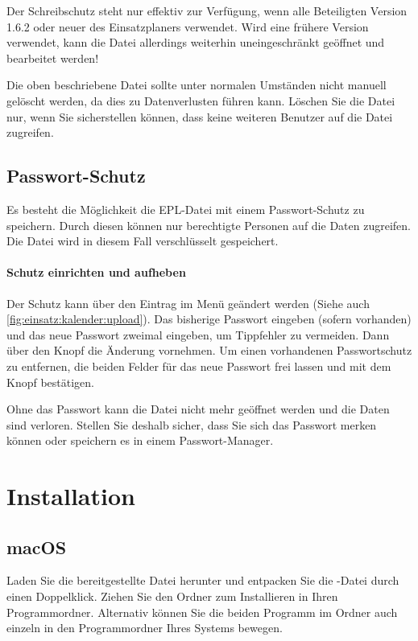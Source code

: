 \begin{hinweis}
  Der Schreibschutz steht nur effektiv zur Verfügung, wenn alle Beteiligten Version 1.6.2 oder neuer des Einsatzplaners verwendet.
  Wird eine frühere Version verwendet, kann die Datei allerdings weiterhin uneingeschränkt geöffnet und bearbeitet werden!
\end{hinweis}


\begin{hinweis}
  Die oben beschriebene Datei sollte unter normalen Umständen nicht manuell gelöscht werden, da dies zu Datenverlusten führen kann.
  Löschen Sie die Datei nur, wenn Sie sicherstellen können, dass keine weiteren Benutzer auf die Datei zugreifen.
\end{hinweis}


\subsection{Passwort-Schutz}\label{epl:allg:datei:passwort}
Es besteht die Möglichkeit die EPL-Datei mit einem Passwort-Schutz zu speichern.
Durch diesen können nur berechtigte Personen auf die Daten zugreifen.
Die Datei wird in diesem Fall verschlüsselt gespeichert.

\paragraph{Schutz einrichten und aufheben}
Der Schutz kann über den Eintrag  im Menü  geändert werden (Siehe auch \cref{fig:einsatz:kalender:upload}).
Das bisherige Passwort eingeben (sofern vorhanden) und das neue Passwort zweimal eingeben, um Tippfehler zu vermeiden.
Dann über den Knopf  die Änderung vornehmen.
Um einen vorhandenen Passwortschutz zu entfernen,
die beiden Felder für das neue Passwort frei lassen und mit dem Knopf bestätigen.


\begin{hinweis}
  Ohne das Passwort kann die Datei nicht mehr geöffnet werden und die Daten sind verloren.
  Stellen Sie deshalb sicher,
  dass Sie sich das Passwort merken können oder speichern es in einem Passwort-Manager.
\end{hinweis}


\section{Installation}\label{epl:allg:installation}
\subsection{macOS}
Laden Sie die bereitgestellte Datei herunter und entpacken Sie die -Datei durch einen Doppelklick.
Ziehen Sie den Ordner  zum Installieren in Ihren Programmordner.
Alternativ können Sie die beiden Programm im Ordner  auch einzeln in den Programmordner Ihres Systems bewegen.

